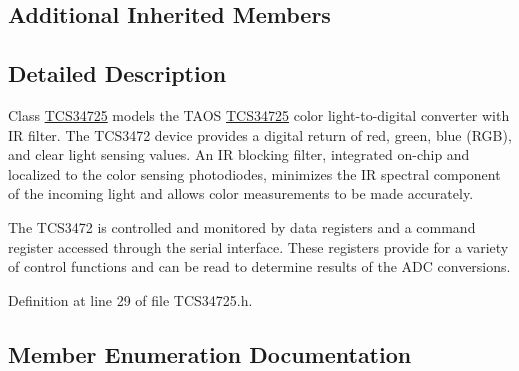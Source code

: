 \subsection*{Additional Inherited Members}


\subsection{Detailed Description}
Class \hyperlink{classsmrtobj_1_1i2c_1_1_t_c_s34725}{T\+C\+S34725} models the T\+A\+O\+S \hyperlink{classsmrtobj_1_1i2c_1_1_t_c_s34725}{T\+C\+S34725} color light-\/to-\/digital converter with I\+R filter. The T\+C\+S3472 device provides a digital return of red, green, blue (R\+G\+B), and clear light sensing values. An I\+R blocking filter, integrated on-\/chip and localized to the color sensing photodiodes, minimizes the I\+R spectral component of the incoming light and allows color measurements to be made accurately.

The T\+C\+S3472 is controlled and monitored by data registers and a command register accessed through the serial interface. These registers provide for a variety of control functions and can be read to determine results of the A\+D\+C conversions. 

Definition at line 29 of file T\+C\+S34725.\+h.



\subsection{Member Enumeration Documentation}
\hypertarget{classsmrtobj_1_1i2c_1_1_t_c_s34725_a3e9fb576b01f6e971eab29fce6f1eaf6}{}
